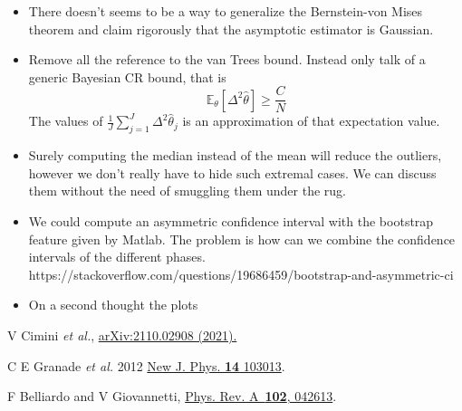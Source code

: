 \documentclass[aps, pra, 10pt, twocolumn, superscriptaddress,floatfix]{revtex4-1}
\begin{document}
\begin{itemize}
	\item There doesn't seems to be a way to generalize the Bernstein-von Mises theorem and claim rigorously that the asymptotic estimator is Gaussian. 
	
	\item Remove all the reference to the van Trees bound. Instead only talk of a generic Bayesian CR bound, that is
	\begin{equation}
		\mathbb{E}_\theta [ \Delta^2 \hat{\theta} ] \ge \frac{C}{N}
	\end{equation}
	The values of $\frac{1}{J} \sum_{j=1}^{J} \Delta^2 \hat{\theta}_j$ is an approximation of that expectation value.
	
	\item Surely computing the median instead of the mean will reduce the outliers, however we don't really have to hide such extremal cases. We can discuss them without the need of smuggling them under the rug.
	
	\item We could compute an asymmetric confidence interval with the bootstrap feature given by Matlab. The problem is how can we combine the confidence intervals of the different phases. https://stackoverflow.com/questions/19686459/bootstrap-and-asymmetric-ci
	
	\item {\color{red} On a second thought the plots}
	
\end{itemize}

\begin{thebibliography}{100}
	
	 V Cimini \textit{et al.}, \href{http://arxiv.org/abs/2110.02908}{arXiv:2110.02908 (2021).}
	
	 C E Granade \textit{et al.} 2012 \href{https://doi.org/10.1088/1367-2630/14/10/103013}{New J. Phys. {\bf 14} 103013}.
	
	
	 F Belliardo and V Giovannetti, \href{https://link.aps.org/doi/10.1103/PhysRevA.102.042613}{Phys. Rev. A~{\bf 102}, 042613}.
	

	
\end{thebibliography}
\end{document}
